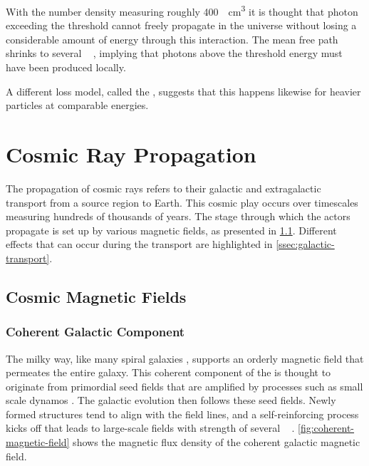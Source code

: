 With the \CMB number density measuring roughly \SI{400}{\per\centi\meter\cubed}
\cite{adamPlanck2015Results2016} it is thought that photon \CRs exceeding the 
\GZK threshold cannot freely propagate in the universe without losing a 
considerable amount of energy through this interaction. The mean free path 
shrinks to several \unit{\mega\parsec} \cite{greisenEndCosmicRaySpectrum1966}, 
implying that photons above the \GZK threshold energy must have been produced 
locally.

A different loss model, called the \GDR 
\cite{steckerPhotodisintegrationUltrahighEnergyCosmic1969}, suggests that this
happens likewise for heavier particles at comparable energies.

\section{Cosmic Ray Propagation}
\label{sec:cr-propagation}

The propagation of cosmic rays refers to their galactic and extragalactic 
transport from a source region to Earth. This cosmic play occurs over 
timescales measuring hundreds of thousands of years. The stage through which 
the \CR actors propagate is set up by various magnetic fields, as presented in 
\cref{ssec:cosmic-magnetic-fields}. Different effects that can occur during the
transport are highlighted in \cref{ssec:galactic-transport}.

\subsection{Cosmic Magnetic Fields}
\label{ssec:cosmic-magnetic-fields}

\halflift

\subsubsection{Coherent Galactic Component}

The milky way, like many spiral galaxies \cite{beckMagneticFieldsSpiral2016}, 
supports an orderly magnetic field that permeates the entire galaxy. This 
coherent component of the \GMF is thought to originate from primordial seed 
fields that are amplified by processes such as small scale dynamos 
\cite{kimInterstellarTurbulenceDriving2006}. The galactic evolution then 
follows these seed fields. Newly formed structures tend to align with the field
lines, and a self-reinforcing process kicks off that leads to large-scale \EM 
fields with strength of several \unit{\upmu\gauss} 
\cite{wangMagnetohydrodynamicSimulationsDisk2009, 
kotarbaMagneticFieldStructure2009, gresselHybridDynamoModel2013}.
\cref{fig:coherent-magnetic-field} shows the magnetic flux density of the 
coherent galactic magnetic field.

